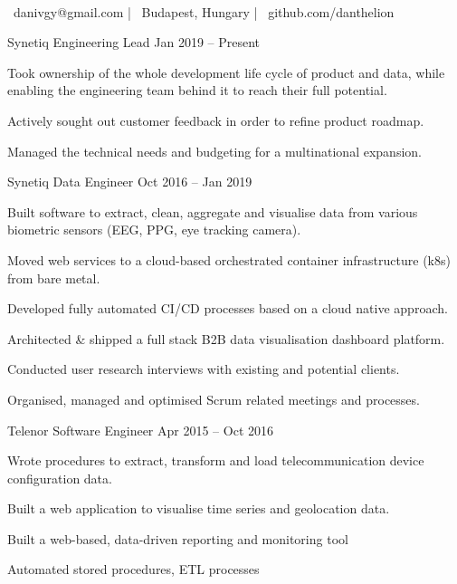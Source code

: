 \documentclass[]{awesome-cv}
\begin{document}
    
\begin{center}
	  \\
	\vspace{2mm}
	{\faEnvelope\ danivgy@gmail.com} | {\faMapMarker\ Budapest, Hungary} | {\faLink\ github.com/danthelion}
\end{center}
\begin{cventries}
	\cventry
	{Synetiq}
	{Engineering Lead}
	{Jan 2019 – Present}
	{}
	{\begin{cvitems}
		\item {Took ownership of the whole development life cycle of product and data, while enabling the engineering team behind it to reach their full potential.}
		\item {Actively sought out customer feedback in order to refine product roadmap.}
		\item {Managed the technical needs and budgeting for a multinational expansion.}
		\end{cvitems}}
	\cventry
	{Synetiq}
	{Data Engineer}
	{Oct 2016 – Jan 2019}
	{}
	{\begin{cvitems}
		\item {Built software to extract, clean, aggregate and visualise data from various biometric sensors (EEG, PPG, eye tracking camera).}
		\item {Moved web services to a cloud-based orchestrated container infrastructure (k8s) from bare metal.}
		\item {Developed fully automated CI/CD processes based on a cloud native approach.}
		\item {Architected \& shipped a full stack B2B data visualisation dashboard platform.}
		\item {Conducted user research interviews with existing and potential clients.}
		\item {Organised, managed and optimised Scrum related meetings and processes.}
		\end{cvitems}}
	\cventry
	{Telenor}
	{Software Engineer}
	{Apr 2015 – Oct 2016}
	{}
	{\begin{cvitems}
		\item {Wrote procedures to extract, transform and load telecommunication device configuration data.}
		\item {Built a web application to visualise time series and geolocation data.}
		\item {Built a web-based, data-driven reporting and monitoring tool}
		\item {Automated stored procedures, ETL processes}
		\end{cvitems}}
\end{cventries}
\end{document}
